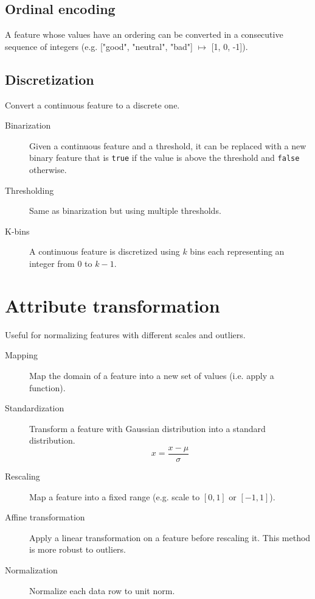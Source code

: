 \subsection{Ordinal encoding} 
    A feature whose values have an ordering can be converted in a consecutive sequence of integers
    (e.g. ["good", "neutral", "bad"] $\mapsto$ [1, 0, -1]).

\subsection{Discretization} 
    Convert a continuous feature to a discrete one.
    \begin{description}
        \item[Binarization] 
            Given a continuous feature and a threshold, 
            it can be replaced with a new binary feature that is \texttt{true} if the value is above the threshold and \texttt{false} otherwise.
        
        \item[Thresholding] 
            Same as binarization but using multiple thresholds.

        \item[K-bins] 
            A continuous feature is discretized using $k$ bins each representing an integer from $0$ to $k-1$.
    \end{description}



\section{Attribute transformation}
Useful for normalizing features with different scales and outliers.

\begin{description}
    \item[Mapping] 
        Map the domain of a feature into a new set of values (i.e. apply a function).

    \item[Standardization] 
        Transform a feature with Gaussian distribution into a standard distribution.
        \[ x = \frac{x - \mu}{\sigma} \]

    \item[Rescaling] 
        Map a feature into a fixed range (e.g. scale to $[0, 1]$ or $[-1, 1]$).

    \item[Affine transformation] 
        Apply a linear transformation on a feature before rescaling it.
        This method is more robust to outliers.

    \item[Normalization] 
        Normalize each data row to unit norm.
\end{description}
